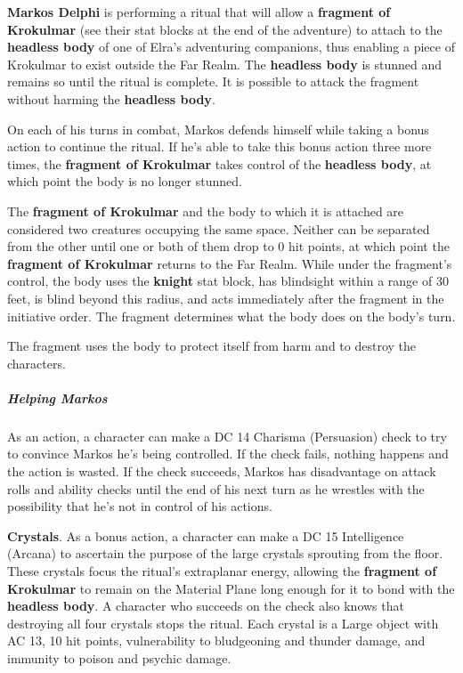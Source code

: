 \documentclass[10pt,a4paper,twoside,bg=print,twocolumn,openany,nodeprecatedcode]{dndbook}
\begin{document}
\textbf{Markos Delphi} is performing a ritual that will allow a \textbf{fragment of Krokulmar} (see their stat blocks at the end of the adventure) to attach to the \textbf{headless body} of one of Elra's adventuring companions, thus enabling a piece of Krokulmar to exist outside the Far Realm. The \textbf{headless body} is stunned and remains so until the ritual is complete. It is possible to attack the fragment without harming the \textbf{headless body}.

On each of his turns in combat, Markos defends himself while taking a bonus action to continue the ritual. If he's able to take this bonus action three more times, the \textbf{fragment of Krokulmar} takes control of the \textbf{headless body}, at which point the body is no longer stunned.

The \textbf{fragment of Krokulmar} and the body to which it is attached are considered two creatures occupying the same space. Neither can be separated from the other until one or both of them drop to 0 hit points, at which point the \textbf{fragment of Krokulmar} returns to the Far Realm. While under the fragment's control, the body uses the \textbf{knight} stat block, has blindsight within a range of 30 feet, is blind beyond this radius, and acts immediately after the fragment in the initiative order. The fragment determines what the body does on the body's turn.

The fragment uses the body to protect itself from harm and to destroy the characters.

\subparagraph{Helping Markos}
As an action, a character can make a DC 14 Charisma (Persuasion) check to try to convince Markos he's being controlled. If the check fails, nothing happens and the action is wasted. If the check succeeds, Markos has disadvantage on attack rolls and ability checks until the end of his next turn as he wrestles with the possibility that he's not in control of his actions.

\textbf{Crystals}. As a bonus action, a character can make a DC 15 Intelligence (Arcana) to ascertain the purpose of the large crystals sprouting from the floor. These crystals focus the ritual's extraplanar energy, allowing the \textbf{fragment of Krokulmar} to remain on the Material Plane long enough for it to bond with the \textbf{headless body}. A character who succeeds on the check also knows that destroying all four crystals stops the ritual. Each crystal is a Large object with AC 13, 10 hit points, vulnerability to bludgeoning and thunder damage, and immunity to poison and psychic damage.
\end{document}
